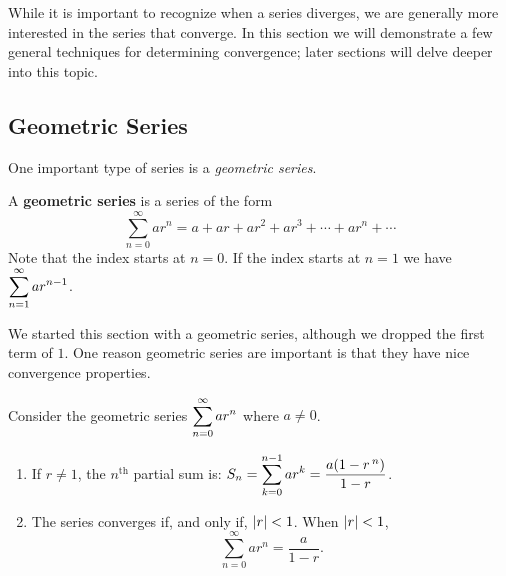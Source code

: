 While it is important to recognize when a series diverges, we are generally more interested in the series that  converge. In this section we will demonstrate a few general techniques for determining convergence; later sections will delve deeper into this topic.

\subsection{Geometric Series}

One important type of series is a \emph{geometric series}.

\begin{definition}\label{def:geom_series}%
A \textbf{geometric series} is a series of the form 
\[\sum_{n=0}^\infty ar^n = a+ar+ar^2+ar^3+\dotsb+ar^n+\dotsb\]
Note that the index starts at $n=0$. If the index starts at $n=1$ we have $\displaystyle \sum_{n=1}^\infty ar^{n-1}$.%
\end{definition}

We started this section with a geometric series, although we dropped the first term of $1$. One reason geometric series are important is that they have nice convergence properties.

\begin{theorem}\label{thm:geom_series}%
Consider the geometric series $\displaystyle \sum_{n=0}^\infty ar^n$ where $a\neq0$.\vspace{-.5\baselineskip}
\begin{enumerate}
\item	If $r\neq1$, the $n^{\text{th}}$ partial sum is: $\displaystyle S_n = \sum_{k=0}^{n-1}ar^k=\frac{a(1-r\,^n)}{1-r}$.
\item	The series converges if, and only if, $\left\lvert r \right\rvert<1$. When $\left\lvert r \right\rvert<1$, 
\[\sum_{n=0}^\infty ar^n = \frac{a}{1-r}.\]
\end{enumerate}
\end{theorem}

